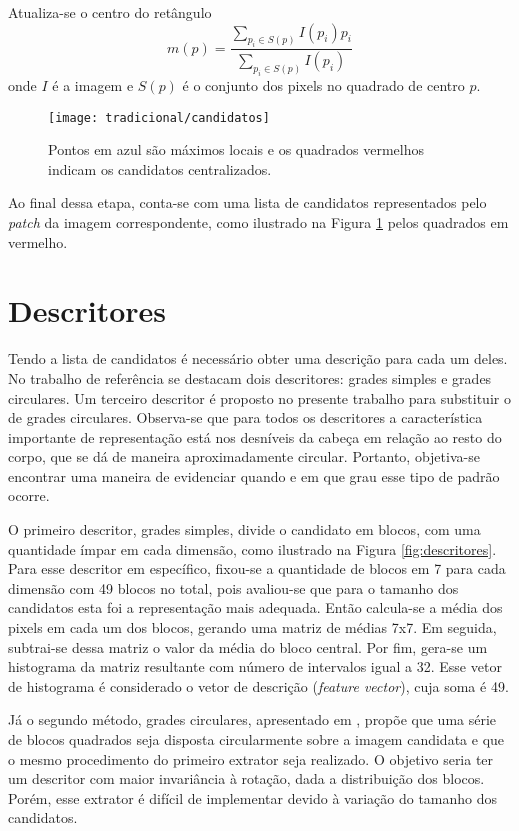 Atualiza-se o centro do retângulo
\begin{equation}
	\label{eq:mean-shift}
	m(p) = \frac{\sum_{p_i \in S(p)} I(p_i)p_i}{\sum_{p_i \in S(p)} I(p_i)}
\end{equation}
onde $I$ é a imagem e $S(p)$ é o conjunto dos pixels no quadrado de centro $p$.

\begin{figure}
\centering
\texttt{[image: tradicional/candidatos]}
\caption{Pontos em azul são máximos locais e os quadrados vermelhos indicam os candidatos centralizados.}
\label{fig:candidatos}
\end{figure}

Ao final dessa etapa, conta-se com uma lista de candidatos representados pelo \textit{patch} da imagem correspondente, como ilustrado na Figura \ref{fig:candidatos} pelos quadrados em vermelho.

\section{Descritores}
\label{sec:tradicional-descritores}
Tendo a lista de candidatos é necessário obter uma descrição para cada um deles. No trabalho de referência \cite{rauter} se destacam dois descritores: grades simples e grades circulares. Um terceiro descritor é proposto no presente trabalho para substituir o de grades circulares. Observa-se que para todos os descritores a característica importante de representação está nos desníveis da cabeça em relação ao resto do corpo, que se dá de maneira aproximadamente circular. Portanto, objetiva-se encontrar uma maneira de evidenciar quando e em que grau esse tipo de padrão ocorre.

O primeiro descritor, grades simples, divide o candidato em blocos, com uma quantidade ímpar em cada dimensão, como ilustrado na Figura \ref{fig:descritores}. Para esse descritor em específico, fixou-se a quantidade de blocos em 7 para cada dimensão com 49 blocos no total, pois avaliou-se que para o tamanho dos candidatos esta foi a representação mais adequada. Então calcula-se a média dos pixels em cada um dos blocos, gerando uma matriz de médias 7x7. Em seguida, subtrai-se dessa matriz o valor da média do bloco central. Por fim, gera-se um histograma da matriz resultante com número de intervalos igual a 32. Esse vetor de histograma é considerado o vetor de descrição (\textit{feature vector}), cuja soma é 49.

Já o segundo método, grades circulares, apresentado em \cite{rauter}, propõe que uma série de blocos quadrados seja disposta circularmente sobre a imagem candidata e que o mesmo procedimento do primeiro extrator seja realizado. O objetivo seria ter um descritor com maior invariância à rotação, dada a distribuição dos blocos. Porém, esse extrator é difícil de implementar devido à variação do tamanho dos candidatos.

